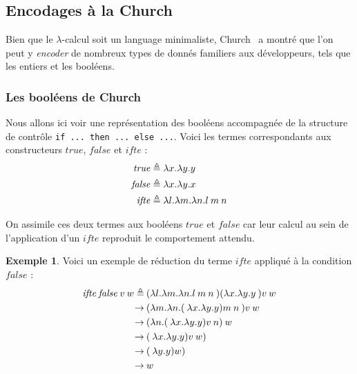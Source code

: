 \documentclass {article}
\theoremstyle{definition}
\newtheorem{example}{Exemple}
\theoremstyle{remark}
\begin{document}
\subsection{Encodages à la Church}

Bien que le $\lambda$-calcul soit un language minimaliste, Church~\citet{church:lambda-calcul} a montré que l'on peut
y \emph{encoder} de nombreux types de donnés familiers aux développeurs, tels que
les entiers et les booléens.


\subsubsection{Les booléens de Church}
\label{church-bool}

\newcommand{\True}{\ensuremath{\mathit{true}}}
\newcommand{\False}{\ensuremath{\mathit{false}}}
\newcommand{\Ifte}{\ensuremath{\mathit{ifte}}}

Nous allons ici voir une représentation des booléens accompagnée de la 
structure de contrôle \texttt{if ... then ... else ...}.
Voici les termes correspondants aux constructeurs \True{}, \False{} et 
\Ifte{} :
\begin{align*}
  \True &\triangleq  \Lam{x}{\Lam{y}{\Var{y}}} \\
  \False &\triangleq \Lam{x}{\Lam{y}{\Var{x}}} \\
  \Ifte &\triangleq \Lam{l}{\Lam{m}{\Lam{n}{\App{\Var{l}}{\App{\Var{m}}{\Var{n}}}}}}  \\
\end{align*}

On assimile ces deux termes aux booléens \True{} et \False{} car leur calcul au sein
de l'application d'un \Ifte{} reproduit le comportement attendu.

\begin{example}
  Voici un exemple de réduction du terme \Ifte{} appliqué à la condition \False{} :
  \begin{align*}
    \App{\App{\App{\Ifte}{\False{}}}{\Var{v}}}{\Var{w}}  \triangleq&\: \App{\App{\App{(\Lam{l}{\Lam{m}{\Lam{n}{\App{\App{l}{m}}{n}}}}})({\Lam{x}{\Lam{y}{y}}}}){v}}{w} \\
    \rightarrow &\: \App{\App{({\Lam{m}{\Lam{n}{\App{\App({\Lam{x}{\Lam{y}{y}}}){m}}{n}}}}}){v}}{w} \\
    \rightarrow &\: \App{(\Lam{n}{\App{\App({\Lam{x}{\Lam{y}{y}}}){v}}{n}})}{w} \\
    \rightarrow &\: \App{\App({\Lam{x}{\Lam{y}{y}}}){v}}{w}) \\
    \rightarrow &\: \App({\Lam{y}{y}}){w}) \\
    \rightarrow &\: \Var{w}
  \end{align*}
\end{example}
\end{document}
